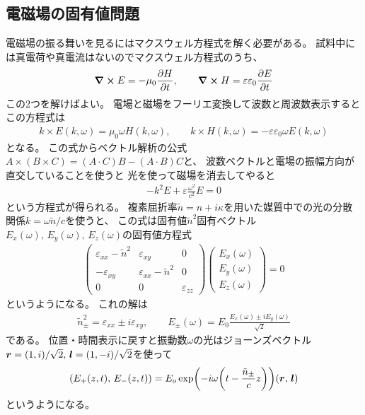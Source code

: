 \documentclass[9pt,dvipdfmx,a4paper]{jsarticle}
\begin{document}
\subsection{電磁場の固有値問題}
電磁場の振る舞いを見るにはマクスウェル方程式を解く必要がある。
試料中には真電荷や真電流はないのでマクスウェル方程式のうち、
\begin{align}
    \curl E = -\mu_0\pdv{H}{t},\qquad \curl{H} = \varepsilon\varepsilon_0 \pdv{E}{t}
\end{align}
この2つを解けばよい。
電場と磁場をフーリエ変換して波数と周波数表示するとこの方程式は
\begin{align}
    k \times E(k,\omega) = \mu_0 \omega H(k,\omega),\qquad
    k \times H(k,\omega) = -\varepsilon\varepsilon_0 \omega E(k,\omega)
\end{align}
となる。
この式からベクトル解析の公式\(A\times(B\times C) = (A\cdot C)B-(A\cdot B)C\)と、
波数ベクトルと電場の振幅方向が直交していることを使うと
光を使って磁場を消去してやると
\begin{align}
    - k^2 E +\varepsilon\frac{\omega^2}{c^2}E = 0
\end{align}
という方程式が得られる。
複素屈折率\(\tilde{n}=n+i\kappa\)を用いた媒質中での光の分散関係\(k = \omega \tilde{n}/c\)を使うと、
この式は固有値\(\tilde{n}^2\)固有ベクトル\(E_x(\omega),\,E_y(\omega),\,E_z(\omega)\)の固有値方程式
\begin{align}
    \begin{pmatrix}
        \varepsilon_{xx}-\tilde{n}^2 & \varepsilon_{xy} & 0\\
        -\varepsilon_{xy} & \varepsilon_{xx}-\tilde{n}^2 & 0 \\
        0 & 0 & \varepsilon_{zz}
    \end{pmatrix}
    \begin{pmatrix}
        E_x(\omega)\\
        E_y(\omega)\\
        E_z(\omega)
    \end{pmatrix} = 0
\end{align}
というようになる。
これの解は
\begin{align}
    \tilde{n}^2_\pm = \varepsilon_{xx} \pm i\varepsilon_{xy},\qquad
    E_{\pm}(\omega) = E_0\frac{E_x(\omega)\pm iE_y(\omega)}{\sqrt{2}}
\end{align}
である。
位置・時間表示に戻すと振動数\(\omega\)の光はジョーンズベクトル\(\vb*{r}=(1,i)/\sqrt{2},\,\vb*{l}=(1,-i)/\sqrt{2}\)を使って
\begin{align}
    (E_{+}(z, t),\,E_{-}(z,t)) = E_o \exp(-i\omega\qty(t-\frac{\tilde{n}_\pm}{c}z))
    (\vb*{r},\,\vb*{l})
\end{align}
というようになる。
\end{document}
